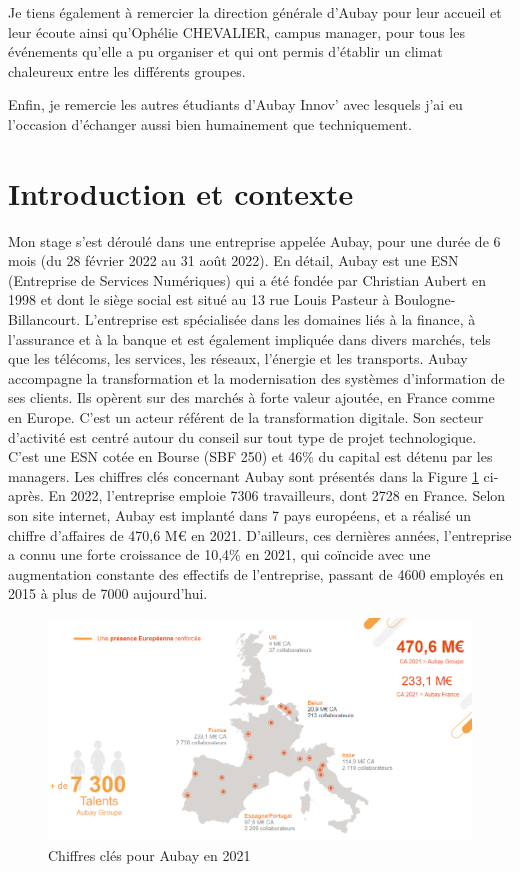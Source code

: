 \documentclass[11pt]{article}
\begin{document}
    Je tiens également à remercier la direction générale d'Aubay pour leur accueil et leur écoute ainsi qu'Ophélie CHEVALIER, campus manager, 
    pour tous les événements qu'elle a pu organiser et qui ont permis d'établir un climat chaleureux entre les différents groupes.
        
    Enfin, je remercie les autres étudiants d’Aubay Innov' avec lesquels j'ai eu l'occasion d'échanger aussi bien humainement que techniquement.

  \pagebreak
  \section{Introduction et contexte}    
  
  Mon stage s'est déroulé dans une entreprise appelée Aubay, pour une durée de 6 mois (du 28 février 2022 au 31 août 2022). 
  En détail, Aubay est une ESN (Entreprise de Services Numériques) qui a été fondée par Christian Aubert en 1998 et 
  dont le siège social est situé au 13 rue Louis Pasteur à Boulogne-Billancourt. L'entreprise est spécialisée dans les domaines 
  liés à la finance, à l'assurance et à la banque et est également impliquée dans divers marchés, tels que les télécoms, 
  les services, les réseaux, l'énergie et les transports. Aubay accompagne la transformation et la modernisation des systèmes 
  d’information de ses clients. Ils opèrent sur des marchés à forte valeur ajoutée, en France comme en Europe. C'est un acteur 
  référent de la transformation digitale. Son secteur d'activité est centré autour du conseil sur tout type de projet technologique.  
  C'est une ESN cotée en Bourse (SBF 250) et 46\% du capital est détenu par les managers. Les chiffres clés concernant Aubay 
  sont présentés dans la Figure \ref{fig:PA1} ci-après. En 2022, l'entreprise emploie 7306 travailleurs, dont 2728 en France. 
  Selon son site internet, Aubay est implanté dans 7 pays européens, et a réalisé un chiffre d'affaires de 470,6 M€ en 2021. 
  D'ailleurs, ces dernières années, l'entreprise a connu une forte croissance de 10,4\% en 2021, qui coïncide avec une augmentation 
  constante des effectifs de l'entreprise, passant de 4600 employés en 2015 à plus de 7000 aujourd'hui.
 
  \begin{figure}[hbt]  
    \includegraphics[width=\textwidth]{PresentationAubay1.png}    
    \caption{Chiffres clés pour Aubay en 2021}
    \label{fig:PA1}
  \end{figure}  
  
\end{document}
